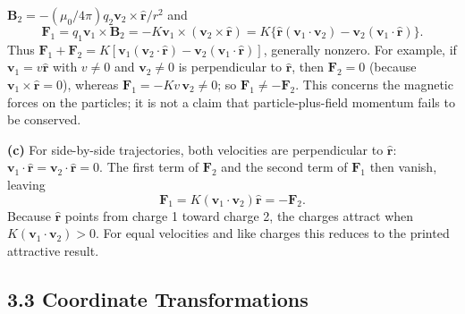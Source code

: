 $\mathbf B_2=-(\mu_0/4\pi)q_2\mathbf v_2\times\hat{\mathbf r}/r^2$ and
\[
\mathbf F_1=q_1\mathbf v_1\times\mathbf B_2
=-K\mathbf v_1\times(\mathbf v_2\times\hat{\mathbf r})
=K\{\hat{\mathbf r}(\mathbf v_1\cdot\mathbf v_2)
-\mathbf v_2(\mathbf v_1\cdot\hat{\mathbf r})\}.
\]
Thus
$\mathbf F_1+\mathbf F_2
=K[\mathbf v_1(\mathbf v_2\cdot\hat{\mathbf r})
-\mathbf v_2(\mathbf v_1\cdot\hat{\mathbf r})]$, generally nonzero.
For example, if $\mathbf v_1=v\hat{\mathbf r}$ with $v\ne0$ and
$\mathbf v_2\ne0$ is perpendicular to $\hat{\mathbf r}$, then
$\mathbf F_2=0$ (because $\mathbf v_1\times\hat{\mathbf r}=0$), whereas
$\mathbf F_1=-Kv\,\mathbf v_2\ne0$; so $\mathbf F_1\ne-\mathbf F_2$.
This concerns the magnetic forces on the particles; it is not a claim
that particle-plus-field momentum fails to be conserved.

\textbf{(c)} For side-by-side trajectories, both velocities are
perpendicular to $\hat{\mathbf r}$:
$\mathbf v_1\cdot\hat{\mathbf r}=\mathbf v_2\cdot\hat{\mathbf r}=0$.
The first term of $\mathbf F_2$ and the second term of $\mathbf F_1$
then vanish, leaving
\[
\boxed{\mathbf F_1=K(\mathbf v_1\cdot\mathbf v_2)\hat{\mathbf r}
=-\mathbf F_2}.
\]
Because $\hat{\mathbf r}$ points from charge 1 toward charge 2, the
charges attract when $K(\mathbf v_1\cdot\mathbf v_2)>0$.
For equal velocities and like charges this reduces to the printed
attractive result.

\subsection*{3.3 Coordinate Transformations}

